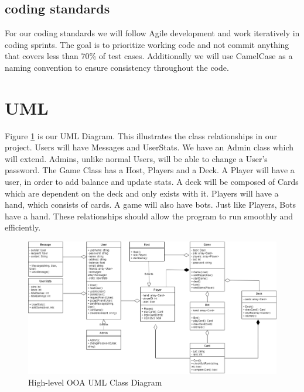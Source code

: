 \documentclass{article}
\begin{document}
\newpage
\subsection{coding standards}
For our coding standards we will follow Agile development and work iteratively in coding sprints. The goal is to prioritize working code and not commit anything that covers less than 70\% of test cases. Additionally we will use CamelCase as a naming convention to ensure consistency throughout the code. 


\section{UML}
Figure \ref{fig:uml} is our UML Diagram. This illustrates the class relationships in our project. Users will have Messages and UserStats. We have an Admin class which will extend. Admins, unlike normal Users, will be able to change a User's password. The Game Class has a Host, Players and a Deck. A Player will have a user, in order to add balance and update stats. A deck will be composed of Cards which are dependent on the deck and only exists with it. Players will have a hand, which consists of cards. A game will also have bots. Just like Players, Bots have a hand. These relationships should allow the program to run smoothly and efficiently.

\begin{figure}[h]
\centering
\includegraphics[width=\linewidth]{Crazy8sUML.png}
\caption{\label{fig:uml}High-level OOA UML Class Diagram}
\end{figure}
\end{document}
